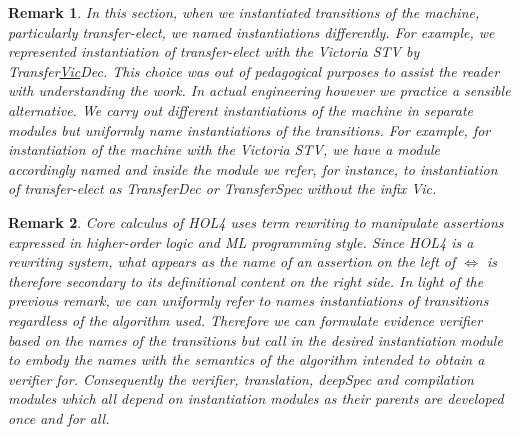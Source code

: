\documentclass[10pt,conference]{IEEEtran}
\newtheorem{remark}{Remark}
\begin{document}
\begin{remark}\label{naming}
In this section, when we instantiated transitions of the machine, particularly transfer-elect, we named instantiations differently. For example, we represented instantiation of transfer-elect with the Victoria STV by  Transfer\underline{Vic}Dec. This choice was out of pedagogical purposes to assist the reader with understanding the work. In actual engineering however we practice a sensible alternative. We carry out different instantiations of the machine in separate modules but uniformly name instantiations of the transitions. For example, for instantiation of the machine with the Victoria STV, we have a module accordingly named and inside the module we refer, for instance, to instantiation of transfer-elect as TransferDec or TransferSpec without the infix Vic.
\end{remark}
\begin{remark}\label{rewrting}
Core calculus of HOL4 uses \emph{term rewriting} to manipulate assertions expressed in higher-order logic and ML programming style. 
Since HOL4 is a rewriting system, what appears as the name of an assertion on the left of $\Leftrightarrow$ is therefore secondary to its definitional content on the right side. In light of the previous remark, we can uniformly refer to \emph{names} instantiations of transitions regardless of the algorithm used. Therefore we can formulate evidence verifier based on the names of the transitions but call in the desired instantiation  module to embody the names with the semantics  of the algorithm intended to obtain a verifier for. Consequently the verifier, translation, deepSpec and compilation modules which all depend on instantiation modules as their parents  are    developed once and for all.   
\end{remark}

 
\end{document}
